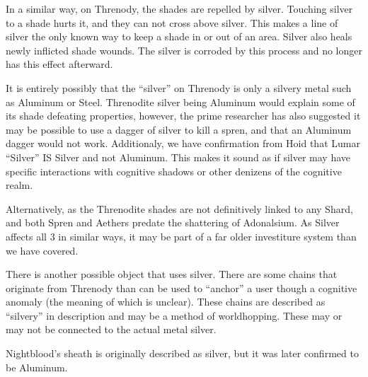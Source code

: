 \documentclass[conference]{IEEEtran}
\newcommand{\n}{\hfill\break}
\begin{document}
 In a similar way, on Threnody, the shades are repelled by silver.\cite{SFSFH-CH3}  Touching silver to a shade hurts it,\cite{SFSFH-CH1} and they can not cross above silver.\cite{SFSFH-CH3}  This makes a line of silver the only known way to keep a shade in or out of an area.\cite{SFSFH-CH1}  Silver also heals newly inflicted shade wounds.\cite{SFSFH-CH2}  The silver is corroded by this process and no longer has this effect afterward.\cite{SFSFH-CH1}  
 
It is entirely possibly that the ``silver'' on Threnody is only a silvery metal such as Aluminum or Steel.  Threnodite silver being Aluminum would explain some of its shade defeating properties, however, the prime researcher has also suggested it may be possible to use a dagger of silver to kill a spren, and that an Aluminum dagger would not work.\cite{silver-spren}  Additionaly, we have confirmation from Hoid that Lumar ``Silver'' IS Silver\cite{ToES-CH4} and not Aluminum.
\cite{ToES-CH23} This makes it sound as if silver may have specific interactions with cognitive shadows or other denizens of the cognitive realm.  

Alternatively, as the Threnodite shades are not definitively linked to any Shard, and both Spren\cite{ado-spren} and Aethers\cite{TLM-CH42} predate the shattering of Adonalsium.  As Silver affects all 3 in similar ways, it may be part of a far older investiture system than we have covered.

There is another possible object that uses silver.  There are some chains that originate from Threnody than can be used to ``anchor'' a user though a cognitive anomaly (the meaning of which is unclear).\cite{anchor}\cite{RoW-CH64}  These chains are described as ``silvery'' in description and may be a method of worldhopping.  These may or may not be connected to the actual metal silver.

Nightblood's sheath is originally described as silver, but it was later confirmed to be Aluminum.\cite{WB-pre}\cite{al-night}


\n
\end{document}

